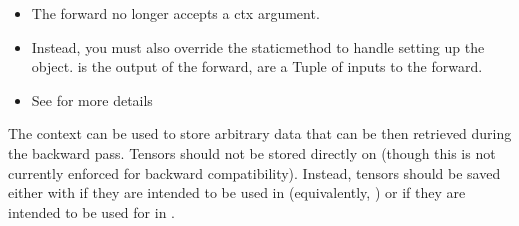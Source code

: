 \documentclass[letterpaper,10pt,english]{sphinxmanual}
\begin{document}
\begin{fulllineitems}
\begin{fulllineitems}
\begin{sphinxVerbatim}[commandchars=\\\{\}]
   \PYG{p}{[} \PYG{p}{]}    
\end{sphinxVerbatim}
\begin{itemize}
\item {} 
\sphinxAtStartPar
The forward no longer accepts a ctx argument.

\item {} 
\sphinxAtStartPar
Instead, you must also override the 
staticmethod to handle setting up the  object.
 is the output of the forward,  are a Tuple of inputs
to the forward.

\item {} 
\sphinxAtStartPar
See  for more details

\end{itemize}

\sphinxAtStartPar
The context can be used to store arbitrary data that can be then
retrieved during the backward pass. Tensors should not be stored
directly on  (though this is not currently enforced for
backward compatibility). Instead, tensors should be saved either with
 if they are intended to be used in
 (equivalently, ) or 
if they are intended to be used for in .

\end{fulllineitems}


\end{fulllineitems}


\sphinxstepscope
\end{document}
